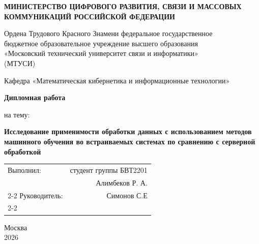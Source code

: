 \begin{titlepage}


\begin{center}
    \textbf{
    МИНИСТЕРСТВО ЦИФРОВОГО РАЗВИТИЯ, СВЯЗИ И МАССОВЫХ 
    КОММУНИКАЦИЙ РОССИЙСКОЙ ФЕДЕРАЦИИ
    }
\end{center}

\begin{center}
    Ордена Трудового Красного Знамени федеральное государственное \\
    бюджетное образовательное учреждение высшего образования \\
    «Московский технический университет связи и информатики» \\
    (МТУСИ)
\end{center}

\begin{center}
    Кафедра «Математическая кибернетика и информационные технологии»
\end{center}

\vspace{5em}

\begin{center}
    \textbf{
    Дипломная работа
    }
\end{center}

\begin{center}
   на тему:
\end{center}

\begin{center}
    \textbf{
    Исследование применимости обработки данных с использованием методов машинного обучения во встраиваемых системах по сравнению с серверной обработкой
    }
\end{center}

\vspace{10em}

\raggedleft
\begin{tabular}{lr} 
    Выполнил:       & студент группы БВТ2201 \\
                    &  Алимбеков Р. А. \\
                    \cmidrule(lr){2-2}
    Руководитель:   & Симонов С.Е \\
                    \cmidrule(lr){2-2}
\end{tabular}

\vfill
\begin{center}
    Москва \\
    2026
\end{center}
\end{titlepage}